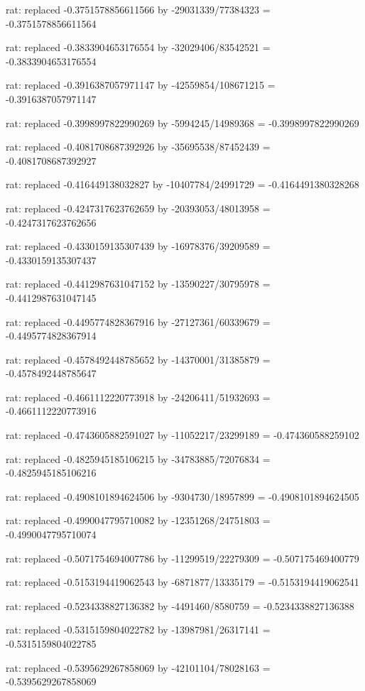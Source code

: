 \documentclass[a4paper,10pt]{article}
\begin{document}
\begin{eulernotebook}
\begin{eulercomment}
\begin{eulercomment}
\begin{eulercomment}
\begin{eulercomment}
\begin{eulercomment}
\begin{eulercomment}
\begin{eulercomment}
\begin{eulercomment}
\begin{eulercomment}
\begin{eulercomment}
\begin{eulercomment}
\begin{eulercomment}
\begin{eulercomment}
\begin{eulercomment}
\begin{eulercomment}
\begin{eulercomment}
\begin{euleroutput}
  rat: replaced -0.3751578856611566 by -29031339/77384323 = -0.3751578856611564
  
  rat: replaced -0.3833904653176554 by -32029406/83542521 = -0.3833904653176554
  
  rat: replaced -0.3916387057971147 by -42559854/108671215 = -0.3916387057971147
  
  rat: replaced -0.3998997822990269 by -5994245/14989368 = -0.3998997822990269
  
  rat: replaced -0.4081708687392926 by -35695538/87452439 = -0.4081708687392927
  
  rat: replaced -0.416449138032827 by -10407784/24991729 = -0.4164491380328268
  
  rat: replaced -0.4247317623762659 by -20393053/48013958 = -0.4247317623762656
  
  rat: replaced -0.4330159135307439 by -16978376/39209589 = -0.4330159135307437
  
  rat: replaced -0.4412987631047152 by -13590227/30795978 = -0.4412987631047145
  
  rat: replaced -0.4495774828367916 by -27127361/60339679 = -0.4495774828367914
  
  rat: replaced -0.4578492448785652 by -14370001/31385879 = -0.4578492448785647
  
  rat: replaced -0.4661112220773918 by -24206411/51932693 = -0.4661112220773916
  
  rat: replaced -0.4743605882591027 by -11052217/23299189 = -0.474360588259102
  
  rat: replaced -0.4825945185106215 by -34783885/72076834 = -0.4825945185106216
  
  rat: replaced -0.4908101894624506 by -9304730/18957899 = -0.4908101894624505
  
  rat: replaced -0.4990047795710082 by -12351268/24751803 = -0.4990047795710074
  
  rat: replaced -0.5071754694007786 by -11299519/22279309 = -0.507175469400779
  
  rat: replaced -0.5153194419062543 by -6871877/13335179 = -0.5153194419062541
  
  rat: replaced -0.5234338827136382 by -4491460/8580759 = -0.5234338827136388
  
  rat: replaced -0.5315159804022782 by -13987981/26317141 = -0.5315159804022785
  
  rat: replaced -0.5395629267858069 by -42101104/78028163 = -0.5395629267858069
  

\end{euleroutput}
\end{eulercomment}
\end{eulercomment}
\end{eulercomment}
\end{eulercomment}
\end{eulercomment}
\end{eulercomment}
\end{eulercomment}
\end{eulercomment}
\end{eulercomment}
\end{eulercomment}
\end{eulercomment}
\end{eulercomment}
\end{eulercomment}
\end{eulercomment}
\end{eulercomment}
\end{eulercomment}
\end{eulernotebook}
\end{document}
